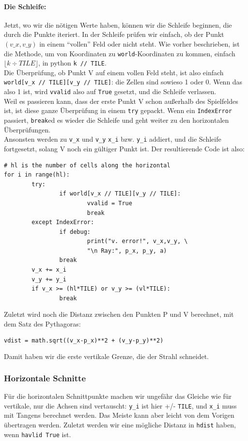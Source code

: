 \documentclass[a4paper,12pt]{report}
\begin{document}
\paragraph{Die Schleife:}
Jetzt, wo wir die nötigen Werte haben, können wir die Schleife beginnen, die durch die Punkte iteriert. In der Schleife prüfen wir einfach, ob der Punkt $(v\_x,v\_y)$ in einem ``vollen'' Feld oder nicht steht. Wie vorher beschrieben, ist die Methode, um von Koordinaten zu \texttt{world}-Koordinaten zu kommen, einfach $\lfloor k \div TILE \rfloor$, in python \texttt{k // TILE}. \\
Die Überprüfung, ob Punkt V auf einem vollen Feld steht, ist also einfach \texttt{world[v\_x // TILE][v\_y // TILE]}: die Zellen sind sowieso 1 oder 0. Wenn das also 1 ist, wird \texttt{vvalid} also auf \texttt{True} gesetzt, und die Schleife verlassen. \\
Weil es passieren kann, dass der erste Punkt V schon außerhalb des Spielfeldes ist, ist diese ganze Überprüfung in einem \texttt{try} gepackt. Wenn ein \texttt{IndexError} passiert, \texttt{break}ed es wieder die Schleife und geht weiter zu den horizontalen Überprüfungen. \\
Ansonsten werden zu \texttt{v\_x} und \texttt{v\_y} \texttt{x\_i} bzw. \texttt{y\_i} addiert, und die Schleife fortgesetzt, solang V noch ein gültiger Punkt ist. Der resultierende Code ist also:
\begin{Verbatim}[baselinestretch=1.0, xleftmargin=1cm]
# hl is the number of cells along the horizontal
for i in range(hl):
        try:
                if world[v_x // TILE][v_y // TILE]:
                        vvalid = True
                        break
        except IndexError:
                if debug:
                        print("v. error!", v_x,v_y, \
                        "\n Ray:", p_x, p_y, a)
                break
        v_x += x_i
        v_y += y_i
        if v_x >= (hl*TILE) or v_y >= (vl*TILE):
                break
\end{Verbatim}

Zuletzt wird noch die Distanz zwischen den Punkten P und V berechnet, mit dem Satz des Pythagoras:
\begin{Verbatim}[baselinestretch=1.0, xleftmargin=1cm]
vdist = math.sqrt((v_x-p_x)**2 + (v_y-p_y)**2)
\end{Verbatim}
Damit haben wir die erste vertikale Grenze, die der Strahl schneidet.

\subsubsection{Horizontale Schnitte}
Für die horizontalen Schnittpunkte machen wir ungefähr das Gleiche wie für vertikale, nur die Achsen sind vertauscht: \texttt{y\_i} ist hier +/- \texttt{TILE}, und \texttt{x\_i} muss mit Tangens berechnet werden. Das Meiste kann aber leicht von dem Vorigen übertragen werden. Zuletzt werden wir eine mögliche Distanz in \texttt{hdist} haben, wenn \texttt{havlid True} ist.
\end{document}
